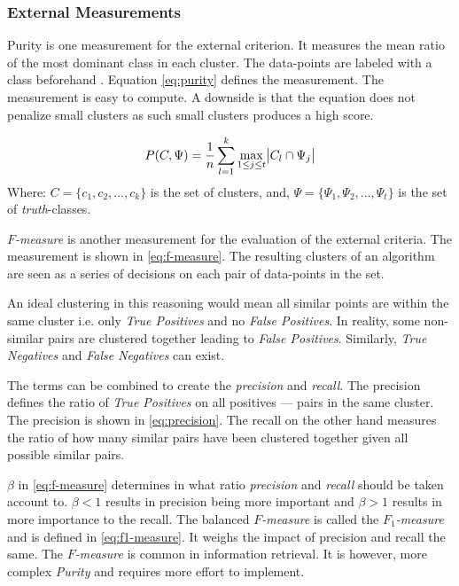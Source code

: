 \documentclass[../report.tex]{subfiles}
\begin{document}
\subsubsection{External Measurements}
Purity is one measurement for the external criterion. It measures the mean ratio of the most dominant class in each cluster. The data-points are labeled with a class beforehand \cite{manning2010introduction}. Equation \ref{eq:purity} defines the measurement. The measurement is easy to compute. A downside is that the equation does not penalize small clusters as such small clusters produces a high score.

\begin{equation}
  \label{eq:purity}
  P(C, \Psi) = \frac{1}{n}\sum^{k}_{l=1}\max_{1 \leq j \leq t}\abs{C_l \cap \Psi_j}
\end{equation}
Where:\newline
$C = \{c_1,c_2,...,c_k\}$ is the set of clusters, and,
$\Psi = \{\Psi_1,\Psi_2,...,\Psi_t \}$ is the set of \textit{truth}-classes.

\textit{$F$-measure} is another measurement for the evaluation of the external criteria. The measurement is shown in \ref{eq:f-measure}\cite{manning2010introduction}. The resulting clusters of an algorithm are seen as a series of decisions on each pair of data-points in the set.

An ideal clustering in this reasoning would mean all similar points are within the same cluster i.e. only \textit{True Positives} and no \textit{False Positives}. In reality, some non-similar pairs are clustered together leading to \textit{False Positives}. Similarly, \textit{True Negatives} and \textit{False Negatives} can exist. 

The terms can be combined to create the \textit{precision} and \textit{recall}. The precision defines the ratio of \textit{True Positives} on all positives --- pairs in the same cluster. The precision is shown in \ref{eq:precision}. The recall on the other hand measures the ratio of how many similar pairs have been clustered together given all possible similar pairs. 

$\beta$ in \ref{eq:f-measure} determines in what ratio \textit{precision} and \textit{recall} should be taken account to. $\beta < 1$ results in precision being more important and $\beta > 1$ results in more importance to the recall. The balanced \textit{$F$-measure} is called the \textit{$F_1$-measure} and is defined in \ref{eq:f1-measure}. It weighs the impact of precision and recall the same. The \textit{$F$-measure} is common in information retrieval. It is however, more complex \textit{Purity} and requires more effort to implement.
\end{document}
